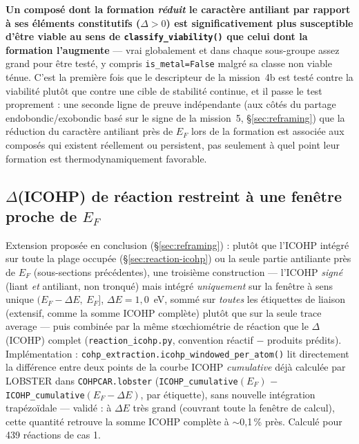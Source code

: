 \documentclass[11pt,a4paper]{article}
\begin{document}
\textbf{Un composé dont la formation \emph{réduit} le caractère
antiliant par rapport à ses éléments constitutifs ($\Delta>0$) est
significativement plus susceptible d'être viable au sens de
\texttt{classify\_viability()} que celui dont la formation
l'augmente} --- vrai globalement et dans chaque sous-groupe assez grand
pour être testé, y compris \texttt{is\_metal=False} malgré sa classe non
viable ténue. C'est la première fois que le descripteur de la
mission~4b est testé contre la viabilité plutôt que contre une cible de
stabilité continue, et il passe le test proprement : une seconde ligne
de preuve indépendante (aux côtés du partage endobondic/exobondic basé
sur le signe de la mission~5, \S\ref{sec:reframing}) que la réduction du
caractère antiliant près de $E_F$ lors de la formation est associée aux
composés qui existent réellement ou persistent, pas seulement à quel
point leur formation est thermodynamiquement favorable.

\subsection{$\Delta$(ICOHP) de réaction restreint à une fenêtre proche de $E_F$}
\label{sec:reaction-icohp-windowed}

Extension proposée en conclusion (\S\ref{sec:reframing}) : plutôt que
l'ICOHP intégré sur toute la plage occupée (\S\ref{sec:reaction-icohp})
ou la seule partie antiliante près de $E_F$ (sous-sections précédentes),
une troisième construction --- l'ICOHP \emph{signé} (liant \emph{et}
antiliant, non tronqué) mais intégré \emph{uniquement} sur la fenêtre à
sens unique $(E_F-\Delta E,\ E_F]$, $\Delta E=1{,}0$~eV, sommé sur
\emph{toutes} les étiquettes de liaison (extensif, comme la somme ICOHP
complète) plutôt que sur la seule trace \og{}average\fg{} --- puis
combinée par la même stœchiométrie de réaction que le $\Delta$(ICOHP)
complet (\texttt{reaction\_icohp.py}, convention réactif $-$ produits
prédits). Implémentation :
\texttt{cohp\_extraction.icohp\_windowed\_per\_atom()} lit directement la
différence entre deux points de la courbe ICOHP \emph{cumulative} déjà
calculée par LOBSTER dans \texttt{COHPCAR.lobster}
(\texttt{ICOHP\_cumulative}$(E_F)$ $-$
\texttt{ICOHP\_cumulative}$(E_F-\Delta E)$, par étiquette), sans nouvelle
intégration trapézoïdale --- validé : à $\Delta E$ très grand (couvrant
toute la fenêtre de calcul), cette quantité retrouve la somme ICOHP
complète à $\sim$0,1\,\% près. Calculé pour 439 réactions de cas 1.
\end{document}
